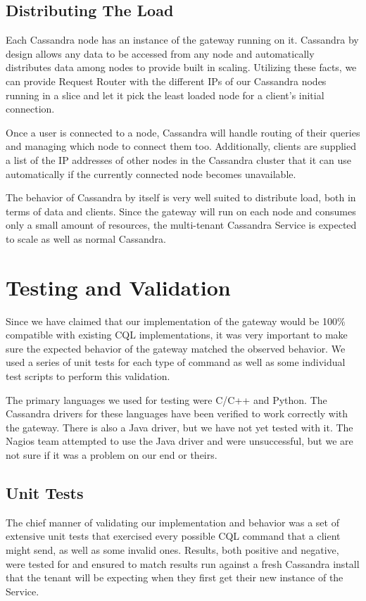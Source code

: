\documentclass[11pt,notitlepage]{report}
\begin{document}
\section*{Distributing The Load}

Each Cassandra node has an instance of the gateway running on it. Cassandra by design allows any data to be accessed from any node and automatically distributes data among nodes to provide built in scaling. Utilizing these facts, we can provide Request Router with the different IPs of our Cassandra nodes running in a slice and let it pick the least loaded node for a client's initial connection.

Once a user is connected to a node, Cassandra will handle routing of their queries and managing which node to connect them too. Additionally, clients are supplied a list of the IP addresses of other nodes in the Cassandra cluster that it can use automatically if the currently connected node becomes unavailable.

The behavior of Cassandra by itself is very well suited to distribute load, both in terms of data and clients. Since the gateway will run on each node and consumes only a small amount of resources, the multi-tenant Cassandra Service is expected to scale as well as normal Cassandra.


\chapter*{Testing and Validation}

Since we have claimed that our implementation of the gateway would be 100$\%$ compatible with existing CQL implementations, it was very important to make sure the expected behavior of the gateway matched the observed behavior. We used a series of unit tests for each type of command as well as some individual test scripts to perform this validation.

The primary languages we used for testing were C/C++ and Python. The Cassandra drivers for these languages have been verified to work correctly with the gateway. There is also a Java driver, but we have not yet tested with it. The Nagios team attempted to use the Java driver and were unsuccessful, but we are not sure if it was a problem on our end or theirs.


\section*{Unit Tests}
The chief manner of validating our implementation and behavior was a set of extensive unit tests that exercised every possible CQL command that a client might send, as well as some invalid ones. Results, both positive and negative, were tested for and ensured to match results run against a fresh Cassandra install that the tenant will be expecting when they first get their new instance of the Service.
\end{document}
